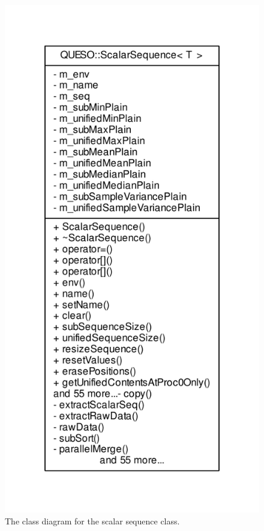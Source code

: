 \begin{figure}[htpb]
\centering
\includegraphics[scale=0.65,clip=true]{rawfigs/scalar_sequence}
\vspace{-1.cm}
\caption{The class diagram for the scalar sequence class.}
\label{fig-scalar-sequence-class}
\end{figure}

